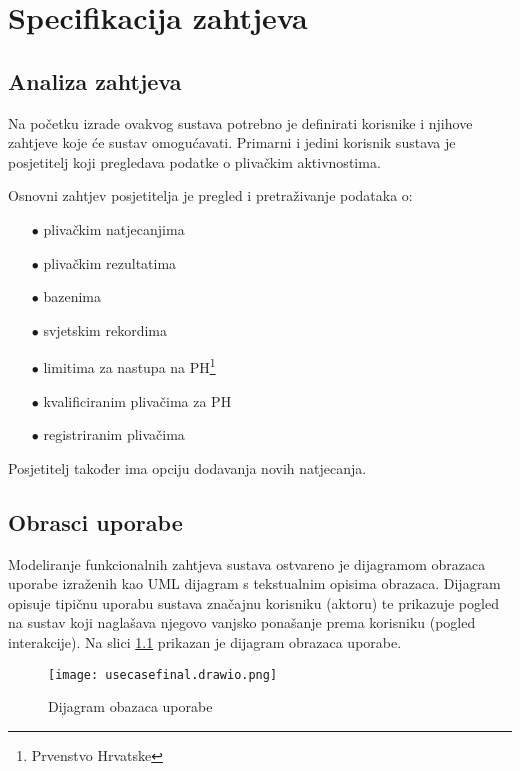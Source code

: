 \documentclass[times, utf8, zavrsni]{fer}
\begin{document}
\chapter{Specifikacija zahtjeva}

\section{Analiza zahtjeva}
Na početku izrade ovakvog sustava potrebno je definirati korisnike i njihove zahtjeve koje će sustav omogućavati.
Primarni i jedini korisnik sustava je posjetitelj koji pregledava podatke o plivačkim aktivnostima.

\noindent Osnovni zahtjev posjetitelja je pregled i pretraživanje podataka o:
\begin{itemize}
    \item[$\bullet$] plivačkim natjecanjima
    \item[$\bullet$] plivačkim rezultatima
    \item[$\bullet$] bazenima
    \item[$\bullet$] svjetskim rekordima
    \item[$\bullet$] limitima za nastupa na PH\footnote{Prvenstvo Hrvatske}
    \item[$\bullet$] kvalificiranim plivačima za PH
    \item[$\bullet$] registriranim plivačima
\end{itemize}


\noindent Posjetitelj također ima opciju dodavanja novih natjecanja.



\section{Obrasci uporabe}

Modeliranje funkcionalnih zahtjeva sustava ostvareno je dijagramom obrazaca uporabe  izraženih kao UML dijagram
s tekstualnim opisima obrazaca. Dijagram opisuje tipičnu uporabu sustava značajnu korisniku (aktoru) te prikazuje pogled na sustav koji naglašava njegovo
vanjsko ponašanje prema korisniku (pogled interakcije). Na slici \ref{fig:use-case} prikazan je dijagram obrazaca uporabe.



\begin{figure}[htb]
    \centering
    \hspace*{-2.5cm}
    \texttt{[image: usecasefinal.drawio.png]}
    \centering
    \caption{Dijagram obazaca uporabe}
    \label{fig:use-case}
\end{figure}
\end{document}
